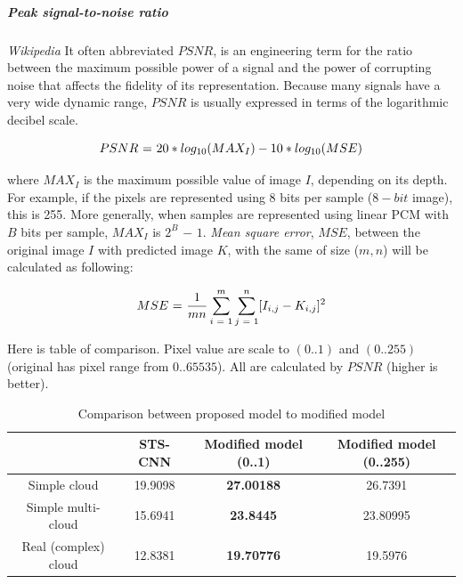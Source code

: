 \subparagraph{Peak signal-to-noise ratio} \textit{Wikipedia} It often abbreviated $PSNR$, is an engineering term for the ratio between the maximum possible power of a signal and the power of corrupting noise that affects the fidelity of its representation. Because many signals have a very wide dynamic range, $PSNR$ is usually expressed in terms of the logarithmic decibel scale. 

\begin{equation}
\label{psnr_eq}
\centering
PSNR \textrm{ = } 20 * log_{10}(MAX_I) - 10 * log_{10}(MSE)
\end{equation}

where $MAX_I$ is the maximum possible value of image $I$, depending on its depth. For example, if the pixels are represented using 8 bits per sample ($8-bit$ image), this is 255. More generally, when samples are represented using linear PCM with $B$ bits per sample, $MAX_I$ is $2^B$ $-$ $1$. \textit{Mean square error}, $MSE$, between the original image $I$ with predicted image $K$, with the same of size ($m, n$) will be calculated as following:

\begin{equation}
\centering
MSE \textrm{ = } \frac{1}{mn} \sum_{i \textrm{ = } 1}^{m} \sum_{j \textrm{ = } 1}^{n} [I_{i,j} - K_{i,j}]^2
\end{equation}

\vspace{0.3cm}
Here is table of comparison. Pixel value are scale to $(0..1)$ and $(0..255)$ (original has pixel range from $0..65535$). All are calculated by $PSNR$ (higher is better).

\begin{table}[h!]
	\centering
	\begin{tabularx}{\textwidth}{|c|c|c|c|}
		\hline
		& STS-CNN & Modified model (0..1) & Modified model (0..255) \\ \hline
		Simple cloud         & 19.9098 & \textbf{27.00188}                                                & 26.7391                                                            \\ \hline
		Simple multi-cloud   & 15.6941 & \textbf{23.8445}                                                 & 23.80995                                                           \\ \hline
		Real (complex) cloud & 12.8381 & \textbf{19.70776}                                                & 19.5976                                                            \\ \hline
	\end{tabularx}
	\caption{Comparison between proposed model to modified model}
\end{table}

